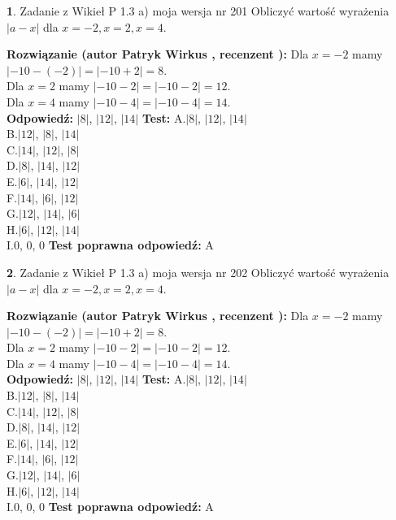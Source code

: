 \documentclass[12pt, a4paper]{article}
\theoremstyle{definition} %
\newtheorem{zad}{}
\newcommand{\zadStart}[1]{\begin{zad}#1\newline}
\newcommand{\zadStop}{\end{zad}}
\newcommand{\rozwStart}[2]{\noindent \textbf{Rozwiązanie (autor #1 , recenzent #2): }\newline}
\newcommand{\rozwStop}{\newline}
\newcommand{\odpStart}{\noindent \textbf{Odpowiedź:}\newline}
\newcommand{\odpStop}{\newline}
\newcommand{\testStart}{\noindent \textbf{Test:}\newline}
\newcommand{\testStop}{\newline}
\newcommand{\kluczStart}{\noindent \textbf{Test poprawna odpowiedź:}\newline}
\newcommand{\kluczStop}{\newline}
\begin{document}
\zadStart{Zadanie z Wikieł P 1.3 a) moja wersja nr 201}
Obliczyć wartość wyrażenia $|a - x|$ dla $x=-2,x=2,x=4$.
\zadStop
\rozwStart{Patryk Wirkus}{}
Dla $x = -2$ mamy $|-10 - (-2)| = |-10 + 2| = 8$.\\
Dla $x = 2$ mamy $|-10 - 2| = |-10 - 2| = 12$.\\
Dla $x = 4$ mamy $|-10 - 4| = |-10 - 4| = 14$.\\
\rozwStop
\odpStart
$|8|$, $|12|$, $|14|$
\odpStop
\testStart
A.$|8|$, $|12|$, $|14|$\\
B.$|12|$, $|8|$, $|14|$\\
C.$|14|$, $|12|$, $|8|$\\
D.$|8|$, $|14|$, $|12|$\\
E.$|6|$, $|14|$, $|12|$\\
F.$|14|$, $|6|$, $|12|$\\
G.$|12|$, $|14|$, $|6|$\\
H.$|6|$, $|12|$, $|14|$\\
I.$0$, $0$, $0$
\testStop
\kluczStart
A
\kluczStop



\zadStart{Zadanie z Wikieł P 1.3 a) moja wersja nr 202}
Obliczyć wartość wyrażenia $|a - x|$ dla $x=-2,x=2,x=4$.
\zadStop
\rozwStart{Patryk Wirkus}{}
Dla $x = -2$ mamy $|-10 - (-2)| = |-10 + 2| = 8$.\\
Dla $x = 2$ mamy $|-10 - 2| = |-10 - 2| = 12$.\\
Dla $x = 4$ mamy $|-10 - 4| = |-10 - 4| = 14$.\\
\rozwStop
\odpStart
$|8|$, $|12|$, $|14|$
\odpStop
\testStart
A.$|8|$, $|12|$, $|14|$\\
B.$|12|$, $|8|$, $|14|$\\
C.$|14|$, $|12|$, $|8|$\\
D.$|8|$, $|14|$, $|12|$\\
E.$|6|$, $|14|$, $|12|$\\
F.$|14|$, $|6|$, $|12|$\\
G.$|12|$, $|14|$, $|6|$\\
H.$|6|$, $|12|$, $|14|$\\
I.$0$, $0$, $0$
\testStop
\kluczStart
A
\kluczStop
\end{document}

